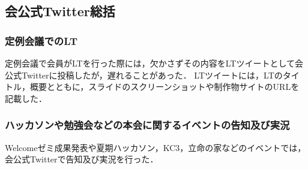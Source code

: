 \subsection*{会公式Twitter総括}


\subsubsection*{定例会議でのLT}
定例会議で会員がLTを行った際には，欠かさずその内容をLTツイートとして会公式Twitterに投稿したが，遅れることがあった．
LTツイートには，LTのタイトル，概要とともに，スライドのスクリーンショットや制作物サイトのURLを記載した．

\subsubsection*{ハッカソンや勉強会などの本会に関するイベントの告知及び実況}
Welcomeゼミ成果発表や夏期ハッカソン，KC3，立命の家などのイベントでは，会公式Twitterで告知及び実況を行った．
